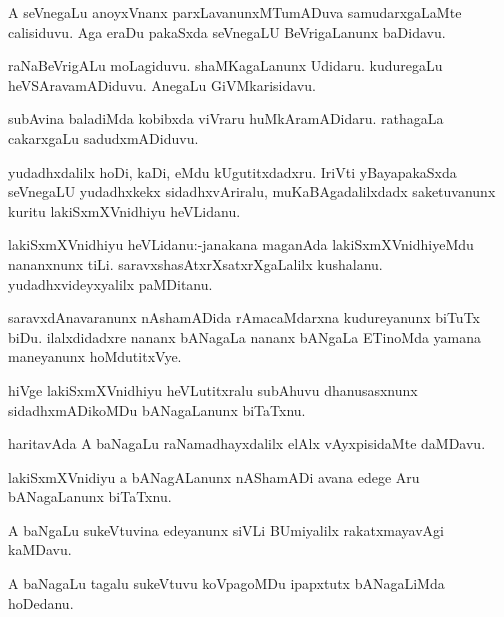 \documentclass{article}
\begin{document}
\begin{mn}%
A seVnegaLu anoyxVnanx parxLavanunxMTumADuva samudarxgaLaMte calisiduvu. Aga eraDu 
pakaSxda seVnegaLU BeVrigaLanunx baDidavu.
\end{mn}

\begin{mn}%
raNaBeVrigALu moLagiduvu. shaMKagaLanunx Udidaru. kuduregaLu heVSAravamADiduvu. AnegaLu 
GiVMkarisidavu.
\end{mn}

\begin{mn}%
subAvina baladiMda kobibxda viVraru huMkAramADidaru. rathagaLa cakarxgaLu sadudxmADiduvu.
\end{mn}

\begin{mn}%
yudadhxdalilx hoDi, kaDi, eMdu kUgutitxdadxru. IriVti yBayapakaSxda seVnegaLU yudadhxkekx 
sidadhxvAriralu, muKaBAgadalilxdadx saketuvanunx kuritu lakiSxmXVnidhiyu heVLidanu.
\end{mn}

\begin{mn}%
lakiSxmXVnidhiyu heVLidanu:-janakana maganAda lakiSxmXVnidhiyeMdu nananxnunx tiLi. 
saravxshasAtxrXsatxrXgaLalilx kushalanu. yudadhxvideyxyalilx paMDitanu.
\end{mn}

\begin{mn}%
saravxdAnavaranunx nAshamADida rAmacaMdarxna kudureyanunx biTuTx biDu. ilalxdidadxre 
nananx bANagaLa nananx bANgaLa ETinoMda yamana maneyanunx hoMdutitxVye. 
\end{mn}

\begin{mn}%
hiVge lakiSxmXVnidhiyu heVLutitxralu subAhuvu dhanusasxnunx sidadhxmADikoMDu bANagaLanunx 
biTaTxnu.
\end{mn}

\begin{mn}%
haritavAda A baNagaLu raNamadhayxdalilx elAlx vAyxpisidaMte daMDavu.
\end{mn}

\begin{mn}%
lakiSxmXVnidiyu a bANagALanunx nAShamADi avana edege  Aru bANagaLanunx biTaTxnu.
\end{mn}

\begin{mn}%
A baNgaLu sukeVtuvina edeyanunx siVLi BUmiyalilx rakatxmayavAgi kaMDavu.
\end{mn}

\begin{mn}%
A baNagaLu tagalu sukeVtuvu koVpagoMDu ipapxtutx bANagaLiMda hoDedanu.
\end{mn}
\end{document}
